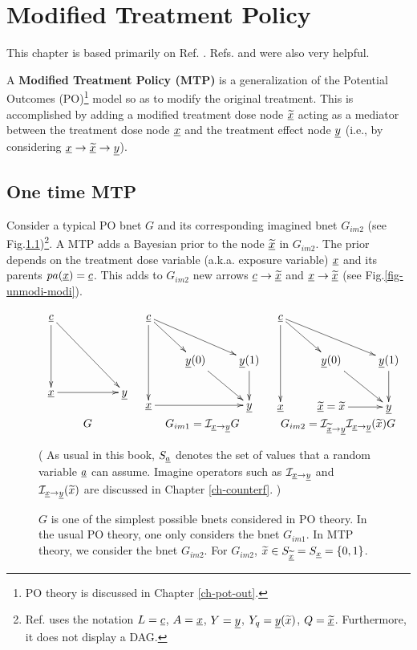 \chapter{Modified Treatment Policy}
\label{ch-modi-treat}

This chapter is based
primarily on Ref. \cite{han-rot-2013}.
Refs.
\cite{hernan-book}
and \cite{khstats-mtp}
were also very helpful.


A {\bf Modified Treatment Policy (MTP)}
is a generalization
of the Potential
Outcomes (PO)\footnote{PO theory
is discussed in Chapter
 \ref{ch-pot-out}.} model
so as to
modify the original treatment.
This is accomplished
by adding a modified treatment
dose node $\underline{{\widetilde{x}}}$
acting as a mediator
between the treatment dose node 
${\underline{x}}$ and the treatment effect node ${\underline{y}}$ (i.e., by considering
${\underline{x}}\rightarrow\underline{{\widetilde{x}}}\rightarrow {\underline{y}}$).

\section{One time MTP}
Consider a typical PO bnet $G$
and its corresponding imagined bnet $G_{im2}$ (see Fig.\ref{fig-modi-po})\footnote{ Ref.\cite{han-rot-2013} uses the
notation $L = {\underline{c}}$,
$A = {\underline{x}}$, $Y={\underline{y}}$,
$Y_q={\underline{y}}({\widetilde{x}})$,
 $Q=\underline{{\widetilde{x}}}$. Furthermore, it does not 
display a DAG.
}.
A MTP adds a Bayesian prior to the
 node $\underline{{\widetilde{x}}}$ in $G_{im2}$.
The prior depends on the treatment
dose variable (a.k.a. exposure variable) ${\underline{x}}$ and its parents $pa({\underline{x}})={\underline{c}}$.
This adds 
to $G_{im2}$  new arrows ${\underline{c}}\rightarrow\underline{{\widetilde{x}}}$
and ${\underline{x}}\rightarrow \underline{{\widetilde{x}}}$ (see Fig.\ref{fig-unmodi-modi}).


\begin{figure}[h!]
$$
\begin{array}{ccc}
\xymatrix{
\rvc
\ar[dd]\ar[ddrr]
\\
\\
\rvx \ar[rr]
&
&\rvy
}
&
\xymatrix{
\rvc
\ar[dd]\ar[dr] \ar[drr]
\\
& \rvy(0)\ar[dr]
&\rvy(1)\ar[d]
\\
\rvx\ar[rr]
&
&\rvy
}
&
\xymatrix{
\rvc
\ar[dd]\ar[dr] \ar[drr]
\\
& \rvy(0)\ar[dr]
&\rvy(1)\ar[d]
\\
\rvx
&\ul{\tilx}=\tilx\ar[r]
&\rvy
}
\\
G
&G_{im1} =\cali_{\rvx\rarrow\rvy} G
& G_{im2}=\cali_{\ul{\tilx}\rarrow\rvy}\cali_{\rvx\rarrow\rvy}(\tilx)G
\end{array}
$$
\caption{$G$ is one of the
simplest possible bnets considered in  PO theory.
In the usual PO theory,
one only considers the bnet $G_{im1}$.
In MTP theory, we
consider the bnet $G_{im2}$.
For $G_{im2}$, ${\widetilde{x}}\in S_{\underline{{\widetilde{x}}}}= 
S_{\underline{x}}=\{0,1\}$.} (
As usual in this book, $S_{\underline{a}}$
denotes the set of
values that a random variable
${\underline{a}}$ can assume.
Imagine operators such as
${\cal I}_{{\underline{x}}\rightarrow {\underline{y}}}$
and ${\cal I}_{{\underline{x}}\rightarrow {\underline{y}}}({\widetilde{x}})$ 
are discussed in Chapter \ref{ch-counterf}.
)
\label{fig-modi-po}
\end{figure}


